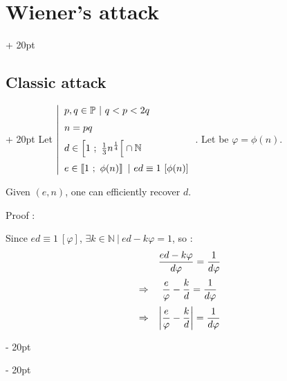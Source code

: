 \documentclass[a4paper, 12pt, twoside]{article}
\newcommand{\N}{\mathbb{N}} %
\newcommand{\nset}[2]{\left\llbracket #1\ ;\ #2 \right\rrbracket}
\newcommand{\abs}[1]{\left\lvert #1 \right\rvert}
\newcommand{\ind}[1][20pt]{\advance\leftskip + #1}
\newcommand{\deind}[1][20pt]{\advance\leftskip - #1}
\newenvironment{indt}[2][20pt]{#2 \par \ind[#1]}{\par \deind} %
\begin{document}
    \vspace{12pt}
    
    \begin{indt}{\section{Wiener's attack}}
        \begin{indt}{\subsection{Classic attack}}
            Let
            $
                \left|
                \begin{array}{l}
                    p, q \in \mathbb{P}\ |\ q < p < 2q
                    \vspace{6pt}
                    \\
                    n = pq
                    \vspace{6pt}
                    \\
                    d \in \left[ 1\ ;\ \frac 1 3 n^{\frac 1 4} \right[ \cap \N
                    \vspace{6pt}
                    \\
                    e \in \nset{1}{\phi(n)}\ |\ ed \equiv 1\ [\phi(n)]
                \end{array}
                \right.
            $.
            Let be $\varphi = \phi(n)$.
            
            Given $(e, n)$, one can efficiently recover $d$.
            
            Proof :
            
            Since $ed \equiv 1 \ [\varphi]$, $\exists k \in \N\ |\ ed - k \varphi = 1$, so :
            \[
                \begin{array}{rc}
                    & \dfrac{ed - k \varphi}{d\varphi} = \dfrac{1}{d\varphi}
                    \vspace{6pt}
                    \\
                    \Rightarrow&
                    \dfrac e \varphi - \dfrac k d = \dfrac 1 {d \varphi}
                    \vspace{6pt}
                    \\
                    \Rightarrow&
                    \abs{\dfrac e \varphi - \dfrac k d} = \dfrac 1 {d \varphi}
                \end{array}
            \]
            

\end{indt}
\end{indt}
\end{document}
